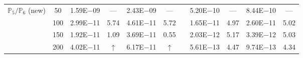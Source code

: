 \begin{table}[H]
{\begin{tabular}{@{}l c c c c c c c c c c@{}}
\midrule
\multirow{4}{*}{$\mathbb{P}_{5}/\mathbb{P}_{6}$ (new)}
 & 50 & 1.59E$-$09 & ---  & 2.43E$-$09 & --- &  & 5.20E$-$10 & --- & 8.44E$-$10 & ---\\
 & 100 & 2.99E$-$11 & 5.74  & 4.61E$-$11 & 5.72 &  & 1.65E$-$11 & 4.97 & 2.60E$-$11 & 5.02\\
 & 150 & 1.92E$-$11 & 1.09  & 3.69E$-$11 & 0.55 &  & 2.03E$-$12 & 5.17 & 3.39E$-$12 & 5.03\\
 & 200 & 4.02E$-$11 & $\uparrow$  & 6.17E$-$11 & $\uparrow$ &  & 5.61E$-$13 & 4.47 & 9.74E$-$13 & 4.34\\
\bottomrule
\end{tabular}}
\label{none}
\end{table}
